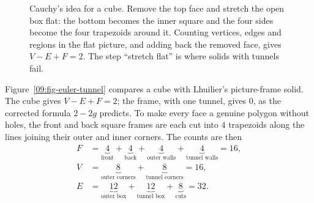 \begin{figure}[htbp]
\caption{Cauchy's idea for a cube. Remove the top face and stretch the open box flat: the bottom becomes the inner square and the four sides become the four trapezoids around it. Counting vertices, edges and regions in the flat picture, and adding back the removed face, gives $V - E + F = 2$. The step ``stretch flat'' is where solids with tunnels fail.}
\label{09:fig-cauchy-flatten}
\end{figure}

Figure~\ref{09:fig-euler-tunnel} compares a cube with Lhuilier's picture-frame solid. The cube gives $V - E + F = 2$; the frame, with one tunnel, gives $0$, as the corrected formula $2 - 2g$ predicts. To make every face a genuine polygon without holes, the front and back square frames are each cut into $4$ trapezoids along the lines joining their outer and inner corners. The counts are then
\begin{align*}
F &= \underbrace{4}_{\text{front}} + \underbrace{4}_{\text{back}} + \underbrace{4}_{\text{outer walls}} + \underbrace{4}_{\text{tunnel walls}} = 16, \\
V &= \underbrace{8}_{\text{outer corners}} + \underbrace{8}_{\text{tunnel corners}} = 16, \\
E &= \underbrace{12}_{\text{outer box}} + \underbrace{12}_{\text{tunnel box}} + \underbrace{8}_{\text{cuts}} = 32.
\end{align*}

